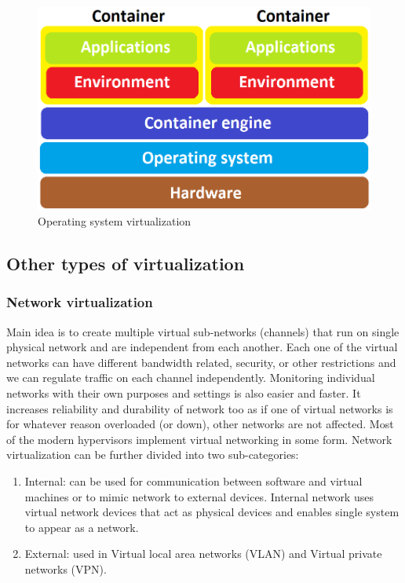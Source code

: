 \begin{figure}[H]
\centering
\includegraphics[scale=0.4]{container.png}
\caption{Operating system virtualization}
\end{figure}


\subsection{Other types of virtualization}
\subsubsection{Network virtualization}
Main idea is to create multiple virtual sub-networks (channels) that run on single physical network and are independent from each another. Each one of the virtual networks can have different bandwidth related, security, or other restrictions and we can regulate traffic on each channel independently.  Monitoring individual networks with their own purposes and settings is also easier and faster. It increases reliability and durability of network too as if one of virtual networks is for whatever reason overloaded (or down), other networks are not affected. Most of the modern hypervisors implement virtual networking in some form. Network virtualization can be further divided into two sub-categories:
\begin{enumerate}
\item Internal: can be used for communication between software and virtual machines or to mimic network to external devices. Internal network uses virtual network devices that act as physical devices and enables single system to appear as a network.
\item External: used in Virtual local area networks (VLAN) and Virtual private networks (VPN).
\end{enumerate}

